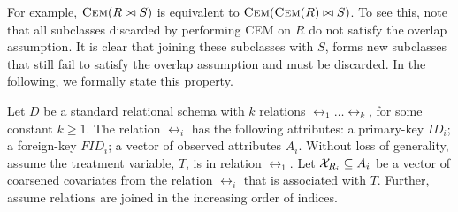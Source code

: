 



For example, ${\textsc{Cem}}(R \bowtie S)$ is equivalent to ${\textsc{Cem}}({\textsc{Cem}}(R)\bowtie S)$.
To see this, note that all subclasses discarded by performing CEM on $R$ do not satisfy the overlap assumption.
It is clear that joining these subclasses with $S$, forms new subclasses that still fail to satisfy the overlap assumption and
must be discarded. In the following, we formally state this property.


Let $D$ be a standard relational schema with $k$ relations
$\rel_1 \ldots \rel_k$, for some constant $k \geq 1$. The relation $\rel_i$
has the following attributes:  a  primary-key $ID_i $;  a foreign-key $FID_i $;   a vector of observed attributes
 $A_i$.  Without loss of generality, assume the treatment variable, $T$, is in relation $\rel_1$.  Let
  ${{\mathcal{X}}}_{{{R}}_i} \subseteq {A}_i$ be a vector of coarsened covariates from the relation $\rel_i$ that is associated with $T$.
    Further, assume relations are joined in the increasing order of indices.


